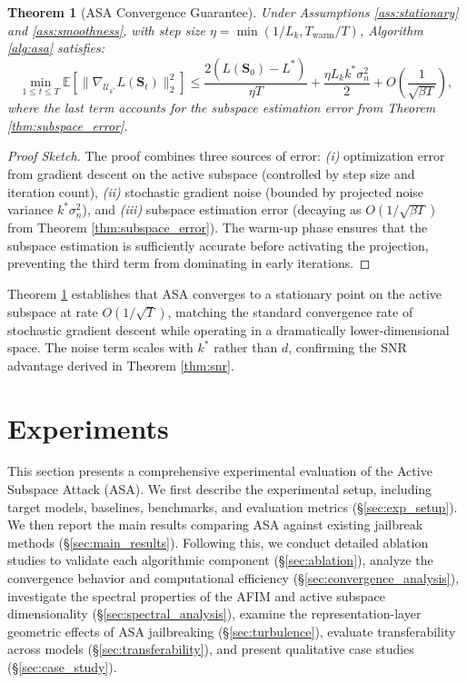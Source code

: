 \documentclass[preprint,12pt]{elsarticle}
\newtheorem{theorem}{Theorem}[section]
\begin{document}
\begin{theorem}[ASA Convergence Guarantee]
\label{thm:asa_convergence}
Under Assumptions \ref{ass:stationary} and \ref{ass:smoothness}, with step size $\eta = \min(1/L_k, T_{\text{warm}}/T)$, Algorithm \ref{alg:asa} satisfies:
\begin{equation}
\label{eq:asa_guarantee}
\min_{1 \leq t \leq T} \mathbb{E}\left[\|\nabla_{\mathcal{U}_{k^*}} L(\mathbf{S}_t)\|_2^2\right] \leq \frac{2(L(\mathbf{S}_0) - L^*)}{\eta T} + \frac{\eta L_k k^* \sigma_n^2}{2} + O\left(\frac{1}{\sqrt{\beta T}}\right),
\end{equation}
where the last term accounts for the subspace estimation error from Theorem \ref{thm:subspace_error}.
\end{theorem}

\begin{proof}[Proof Sketch]
The proof combines three sources of error: \textit{(i)} optimization error from gradient descent on the active subspace (controlled by step size and iteration count), \textit{(ii)} stochastic gradient noise (bounded by projected noise variance $k^* \sigma_n^2$), and \textit{(iii)} subspace estimation error (decaying as $O(1/\sqrt{\beta T})$ from Theorem \ref{thm:subspace_error}). The warm-up phase ensures that the subspace estimation is sufficiently accurate before activating the projection, preventing the third term from dominating in early iterations.
\end{proof}

Theorem \ref{thm:asa_convergence} establishes that ASA converges to a stationary point on the active subspace at rate $O(1/\sqrt{T})$, matching the standard convergence rate of stochastic gradient descent while operating in a dramatically lower-dimensional space. The noise term scales with $k^*$ rather than $d$, confirming the SNR advantage derived in Theorem \ref{thm:snr}.



\section{Experiments}
\label{sec:experiments}

This section presents a comprehensive experimental evaluation of the Active Subspace Attack (ASA). We first describe the experimental setup, including target models, baselines, benchmarks, and evaluation metrics (\S\ref{sec:exp_setup}). We then report the main results comparing ASA against existing jailbreak methods (\S\ref{sec:main_results}). Following this, we conduct detailed ablation studies to validate each algorithmic component (\S\ref{sec:ablation}), analyze the convergence behavior and computational efficiency (\S\ref{sec:convergence_analysis}), investigate the spectral properties of the AFIM and active subspace dimensionality (\S\ref{sec:spectral_analysis}), examine the representation-layer geometric effects of ASA jailbreaking (\S\ref{sec:turbulence}), evaluate transferability across models (\S\ref{sec:transferability}), and present qualitative case studies (\S\ref{sec:case_study}).
\end{document}
